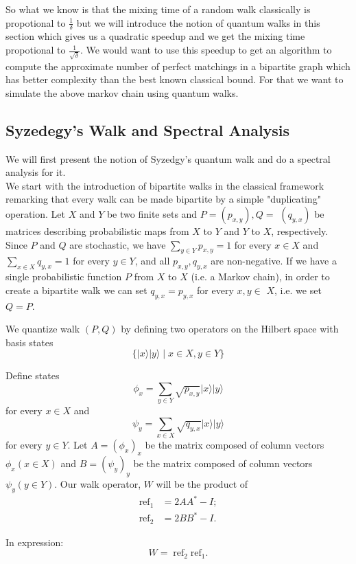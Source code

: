 So what we know is that the mixing time of a random walk classically is propotional to $\frac{1}{\delta}$ but we will introduce the notion of quantum walks in this section which gives us a quadratic speedup and we get the mixing time propotional to $\frac{1}{\sqrt{\delta}}$. We would want to use this speedup to get an algorithm to compute the approximate number of perfect matchings in a bipartite graph which has better complexity than the best known classical bound. For that we want to simulate the above markov chain using quantum walks.
\\
\subsection{Syzedegy's Walk and Spectral Analysis}
We will first present the notion of Syzedgy's quantum walk and do a spectral analysis for it.\\
We start with the introduction of bipartite walks in the classical framework remarking that every walk can be made bipartite by a simple "duplicating" operation. Let $X$ and $Y$ be two finite sets and $P=\left(p_{x, y}\right), Q=$ $\left(q_{y, x}\right)$ be matrices describing probabilistic maps from $X$ to $Y$ and $Y$ to $X$, respectively. Since $P$ and $Q$ are stochastic, we have $\sum_{y \in Y} p_{x, y}=1$ for every $x \in X$ and $\sum_{x \in X} q_{y, x}=1$ for every $y \in Y$, and all $p_{x, y}, q_{y, x}$ are non-negative. If we have a single probabilistic function $P$ from $X$ to $X$ (i.e. a Markov chain), in order to create a bipartite walk we can set $q_{y, x}=p_{y, x}$ for every $x, y \in$ $X$, i.e. we set $Q=P$.

We quantize walk $(P, Q)$ by defining two operators on the Hilbert space with basis states
$$
\{|x\rangle|y\rangle \mid x \in X, y \in Y\}
$$

Define states
$$
\phi_x=\sum_{y \in Y} \sqrt{p_{x, y}}|x\rangle|y\rangle
$$
for every $x \in X$ and
$$
\psi_y=\sum_{x \in X} \sqrt{q_{y, x}}|x\rangle|y\rangle
$$
for every $y \in Y$. Let $A=\left(\phi_x\right)_x$ be the matrix composed of column vectors $\phi_x(x \in X)$ and $B=\left(\psi_y\right)_y$ be the matrix composed of column vectors $\psi_y(y \in Y)$. Our walk operator, $W$ will be the product of
$$
\begin{aligned}
	\operatorname{ref}_1 & =2 A A^*-I ; \\
	\operatorname{ref}_2 & =2 B B^*-I .
\end{aligned}
$$

In expression:
$$
W=\operatorname{ref}_2 \mathrm{ref}_1 .
$$


